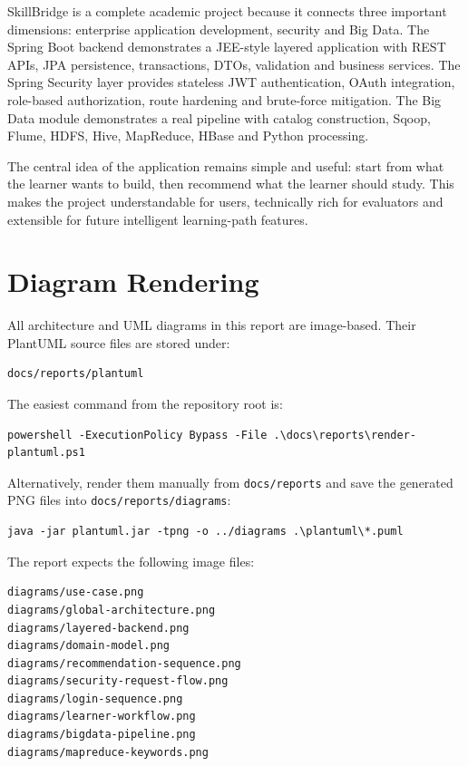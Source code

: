 \documentclass[12pt,a4paper]{report}
\newcommand{\projectName}{SkillBridge}
\begin{document}
\projectName{} is a complete academic project because it connects three important dimensions: enterprise application development, security and Big Data. The Spring Boot backend demonstrates a JEE-style layered application with REST APIs, JPA persistence, transactions, DTOs, validation and business services. The Spring Security layer provides stateless JWT authentication, OAuth integration, role-based authorization, route hardening and brute-force mitigation. The Big Data module demonstrates a real pipeline with catalog construction, Sqoop, Flume, HDFS, Hive, MapReduce, HBase and Python processing.

The central idea of the application remains simple and useful: start from what the learner wants to build, then recommend what the learner should study. This makes the project understandable for users, technically rich for evaluators and extensible for future intelligent learning-path features.

\appendix

\chapter{Diagram Rendering}
All architecture and UML diagrams in this report are image-based. Their PlantUML source files are stored under:

\begin{lstlisting}
docs/reports/plantuml
\end{lstlisting}

The easiest command from the repository root is:

\begin{lstlisting}
powershell -ExecutionPolicy Bypass -File .\docs\reports\render-plantuml.ps1
\end{lstlisting}

Alternatively, render them manually from \texttt{docs/reports} and save the generated PNG files into \texttt{docs/reports/diagrams}:

\begin{lstlisting}
java -jar plantuml.jar -tpng -o ../diagrams .\plantuml\*.puml
\end{lstlisting}

The report expects the following image files:

\begin{lstlisting}
diagrams/use-case.png
diagrams/global-architecture.png
diagrams/layered-backend.png
diagrams/domain-model.png
diagrams/recommendation-sequence.png
diagrams/security-request-flow.png
diagrams/login-sequence.png
diagrams/learner-workflow.png
diagrams/bigdata-pipeline.png
diagrams/mapreduce-keywords.png
\end{lstlisting}
\end{document}
